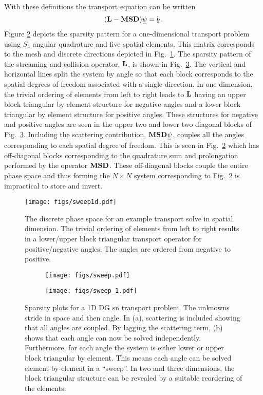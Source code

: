 \documentclass[../doc.tex]{subfiles}
\begin{document}
With these definitions the transport equation can be written 
	\begin{equation}
		(\mat{L} - \mat{M}\mat{S}\mat{D})\ubar{\psi} = \ubar{b} \,. 
	\end{equation}
Figure \ref{sn:discrete_full} depicts the sparsity pattern for a one-dimensional transport problem using $S_4$ angular quadrature and five spatial elements. This matrix corresponds to the mesh and discrete directions depicted in Fig.~\ref{sn:sweep1d}. The sparsity pattern of the streaming and collision operator, $\boldsymbol{\mathrm{L}}$, is shown in Fig.~\ref{sn:discrete_lag}. The vertical and horizontal lines split the system by angle so that each block corresponds to the spatial degrees of freedom associated with a single direction. 
In one dimension, the trivial ordering of elements from left to right leads to $\boldsymbol{\mathrm{L}}$ having an upper block triangular by element structure for negative angles and a lower block triangular by element structure for positive angles. These structures for negative and positive angles are seen in the upper two and lower two diagonal blocks of Fig.~\ref{sn:discrete_lag}. Including the scattering contribution, $\mat{M}\mat{S}\mat{D}\ubar{\psi}$, couples all the angles corresponding to each spatial degree of freedom. This is seen in Fig.~\ref{sn:discrete_full} which has off-diagonal blocks corresponding to the quadrature sum and prolongation performed by the operator $\boldsymbol{\mathrm{M}}\boldsymbol{\mathrm{S}}\boldsymbol{\mathrm{D}}$. These off-diagonal blocks couple the entire phase space and thus forming the $N\times N$ system corresponding to Fig.~\ref{sn:discrete_full} is impractical to store and invert. 
\begin{figure}
\centering
\texttt{[image: figs/sweep1d.pdf]}
\caption{The discrete phase space for an example transport solve in spatial dimension. The trivial ordering of elements from left to right results in a lower/upper block triangular transport operator for positive/negative angles. The angles are ordered from negative to positive. }
\label{sn:sweep1d}
\end{figure}
\begin{figure}
\centering
\begin{subfigure}{.49\textwidth}
	\centering
	\texttt{[image: figs/sweep.pdf]}
	\caption{}
	\label{sn:discrete_full}
\end{subfigure}
\begin{subfigure}{.49\textwidth}
	\centering
	\texttt{[image: figs/sweep\_1.pdf]}
	\caption{}
	\label{sn:discrete_lag}
\end{subfigure}
\caption{Sparsity plots for a 1D DG \gls{sn} transport problem. The unknowns stride in space and then angle. In (a), scattering is included showing that all angles are coupled. By lagging the scattering term, (b) shows that each angle can now be solved independently. Furthermore, for each angle the system is either lower or upper block triangular by element. This means each angle can be solved element-by-element in a ``sweep''. In two and three dimensions, the block triangular structure can be revealed by a suitable reordering of the elements.}
\label{sn:sweep}
\end{figure}
\end{document}
